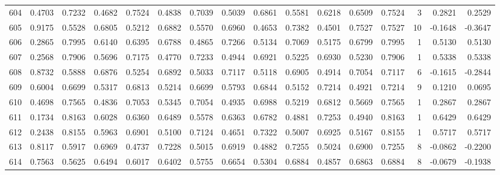 \begin{tabular}{lrrrrrrrrrrrrrrr}
604 &      0.4703 &  0.7232 &  0.4682 &  0.7524 &  0.4838 &  0.7039 &  0.5039 &  0.6861 &  0.5581 &  0.6218 &   0.6509 &     0.7524 &      3 &                    0.2821 &                     0.2529 \\
605 &      0.9175 &  0.5528 &  0.6805 &  0.5212 &  0.6882 &  0.5570 &  0.6960 &  0.4653 &  0.7382 &  0.4501 &   0.7527 &     0.7527 &     10 &                   -0.1648 &                    -0.3647 \\
606 &      0.2865 &  0.7995 &  0.6140 &  0.6395 &  0.6788 &  0.4865 &  0.7266 &  0.5134 &  0.7069 &  0.5175 &   0.6799 &     0.7995 &      1 &                    0.5130 &                     0.5130 \\
607 &      0.2568 &  0.7906 &  0.5696 &  0.7175 &  0.4770 &  0.7233 &  0.4944 &  0.6921 &  0.5225 &  0.6930 &   0.5230 &     0.7906 &      1 &                    0.5338 &                     0.5338 \\
608 &      0.8732 &  0.5888 &  0.6876 &  0.5254 &  0.6892 &  0.5033 &  0.7117 &  0.5118 &  0.6905 &  0.4914 &   0.7054 &     0.7117 &      6 &                   -0.1615 &                    -0.2844 \\
609 &      0.6004 &  0.6699 &  0.5317 &  0.6813 &  0.5214 &  0.6699 &  0.5793 &  0.6844 &  0.5152 &  0.7214 &   0.4921 &     0.7214 &      9 &                    0.1210 &                     0.0695 \\
610 &      0.4698 &  0.7565 &  0.4836 &  0.7053 &  0.5345 &  0.7054 &  0.4935 &  0.6988 &  0.5219 &  0.6812 &   0.5669 &     0.7565 &      1 &                    0.2867 &                     0.2867 \\
611 &      0.1734 &  0.8163 &  0.6028 &  0.6360 &  0.6489 &  0.5578 &  0.6363 &  0.6782 &  0.4881 &  0.7253 &   0.4940 &     0.8163 &      1 &                    0.6429 &                     0.6429 \\
612 &      0.2438 &  0.8155 &  0.5963 &  0.6901 &  0.5100 &  0.7124 &  0.4651 &  0.7322 &  0.5007 &  0.6925 &   0.5167 &     0.8155 &      1 &                    0.5717 &                     0.5717 \\
613 &      0.8117 &  0.5917 &  0.6969 &  0.4737 &  0.7228 &  0.5015 &  0.6919 &  0.4882 &  0.7255 &  0.5024 &   0.6900 &     0.7255 &      8 &                   -0.0862 &                    -0.2200 \\
614 &      0.7563 &  0.5625 &  0.6494 &  0.6017 &  0.6402 &  0.5755 &  0.6654 &  0.5304 &  0.6884 &  0.4857 &   0.6863 &     0.6884 &      8 &                   -0.0679 &                    -0.1938 \\

\end{tabular}

